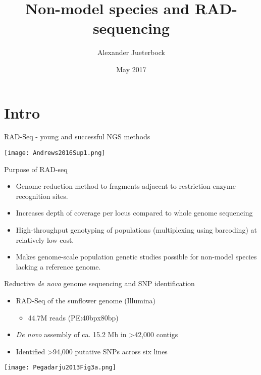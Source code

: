 \documentclass[presentation]{beamer}
\author{Alexander Jueterbock}
\date{May 2017}
\title{Non-model species and RAD-sequencing}
\begin{document}
\maketitle


\section{Intro}
\label{sec-1}
\begin{frame}[label=sec-1-0-1]{RAD-Seq - young and successful NGS methods}
\begin{center}


\texttt{[image: Andrews2016Sup1.png]}

\tiny{\citep{Andrews2016}}
\end{center}
\end{frame}


\begin{frame}[label=sec-1-0-2]{Purpose of RAD-seq}
\begin{itemize}
\item Genome-reduction method to fragments adjacent to restriction enzyme
recognition sites.
\item Increases depth of coverage per locus compared to whole genome
sequencing
\item High-throughput genotyping of populations (multiplexing using
barcoding) at relatively low cost.
\item Makes genome-scale population genetic studies possible for non-model
species lacking a reference genome.
\end{itemize}
\end{frame}


\begin{frame}[label=sec-1-0-3]{Reductive \emph{de novo} genome sequencing and SNP identification}
\begin{itemize}
\item RAD-Seq of the sunflower genome (Illumina)
\begin{itemize}
\item 44.7M reads (PE:40bpx80bp)
\end{itemize}
\item \emph{De novo} assembly of ca. 15.2 Mb 
in >42,000 contigs
\item Identified >94,000 putative SNPs across six lines
\end{itemize}
\begin{center}

\texttt{[image: Pegadarju2013Fig3a.png]}


\tiny{\citep{Pegadaraju2013}}
\end{center}
\end{frame}
\end{document}
